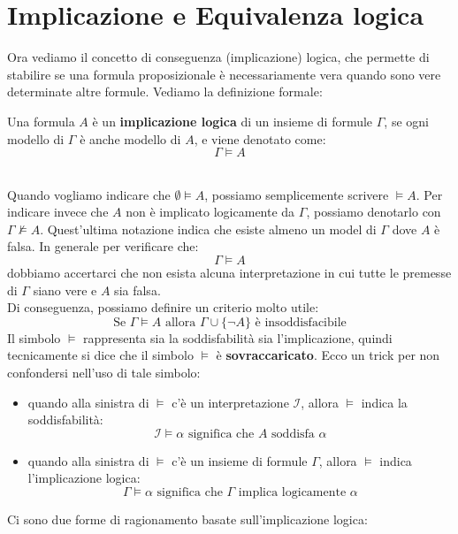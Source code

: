 \section{Implicazione e Equivalenza logica}
Ora vediamo il concetto di conseguenza (implicazione) logica, che permette di stabilire se una formula proposizionale è necessariamente vera quando sono vere determinate altre formule.
Vediamo la definizione formale:\smallskip\\
\colorbox{SALZO}{\parbox{\dimexpr\linewidth-2\fboxsep}{\begin{definition}
    Una formula $A$ è un \textbf{implicazione logica} di un insieme di formule $\Gamma$, se ogni modello di $\Gamma$ è anche modello di $A$, e viene denotato come:
    \[   \Gamma \models A   \]
\end{definition}}}\smallskip\\
Quando vogliamo indicare che $\emptyset \models A$, possiamo semplicemente scrivere $\models A $. Per indicare invece che $A$ non è implicato logicamente da $\Gamma$, possiamo denotarlo con 
$\Gamma \not\models A$. Quest'ultima notazione indica che esiste almeno un model di $\Gamma$ dove $A$ è falsa. In generale per verificare che:
\[    \Gamma \models A  \]
dobbiamo accertarci che non esista alcuna interpretazione in cui tutte le premesse di $\Gamma$ siano vere e $A$ sia falsa.\\
Di conseguenza, possiamo definire un criterio molto utile:
\[     \text{Se }\Gamma \models A \text{ allora } \Gamma \cup \{ \neg A \} \text{ è insoddisfacibile}       \]
Il simbolo $\models$ rappresenta sia la soddisfabilità sia l'implicazione, quindi tecnicamente si dice che il simbolo $\models$ è \textbf{sovraccaricato}. Ecco 
un trick per non confondersi nell'uso di tale simbolo:
\begin{itemize}
    \item quando alla sinistra di $\models$ c'è un interpretazione $\mathcal{I}$, allora $\models$ indica la soddisfabilità:
    \[  \mathcal{I} \models \alpha \text{ significa che } A \text{ soddisfa } \alpha   \]
    \item quando alla sinistra di $\models$ c'è un insieme di formule $\Gamma$, allora $\models$ indica l'implicazione logica:
    \[     \Gamma \models \alpha \text{ significa che } \Gamma \text{ implica logicamente } \alpha    \]
\end{itemize}
\noindent Ci sono due forme di ragionamento basate sull'implicazione logica:
